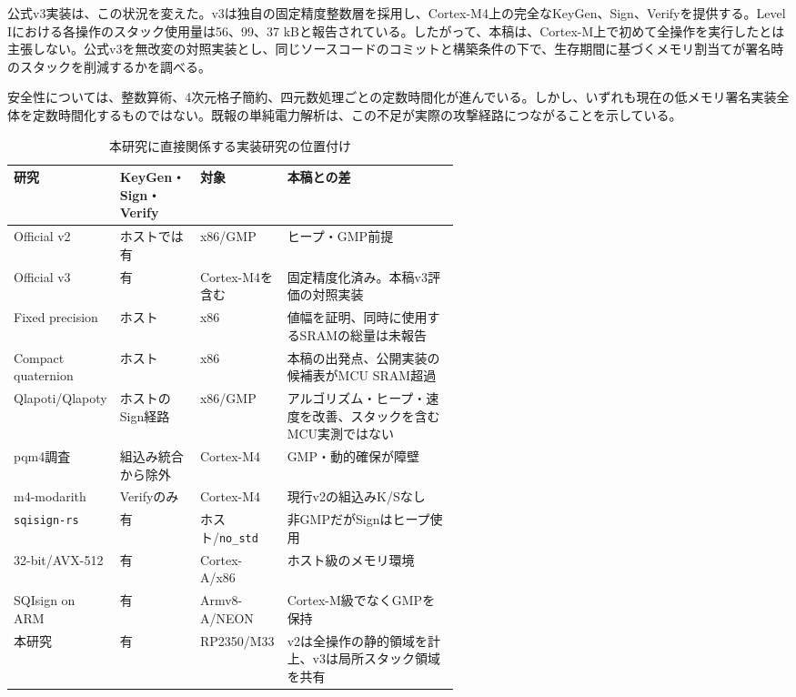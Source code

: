 \documentclass[a4paper,10pt]{ltjsarticle}
\theoremstyle{definition}
\theoremstyle{remark}
\begin{document}
公式v3実装は、この状況を変えた。v3は独自の固定精度整数層を採用し、Cortex-M4上の完全なKeyGen、Sign、Verifyを提供する。Level Iにおける各操作のスタック使用量は56、99、37 kBと報告されている\cite{sqisign-spec-v3,sqisign-code-v3}。したがって、本稿は、Cortex-M上で初めて全操作を実行したとは主張しない。公式v3を無改変の対照実装とし、同じソースコードのコミットと構築条件の下で、生存期間に基づくメモリ割当てが署名時のスタックを削減するかを調べる。

安全性については、整数算術\cite{ct-integer-2025}、4次元格子簡約\cite{ct-lattice-2025}、四元数処理\cite{ct-quaternion-2025}ごとの定数時間化が進んでいる。しかし、いずれも現在の低メモリ署名実装全体を定数時間化するものではない。既報の単純電力解析\cite{spa-2025}は、この不足が実際の攻撃経路につながることを示している。

\begin{table}[H]
  \centering
  \caption{本研究に直接関係する実装研究の位置付け}
  \label{tab:related-matrix}
  \scriptsize
  \begin{tabularx}{\linewidth}{@{}p{0.21\linewidth}p{0.18\linewidth}p{0.18\linewidth}X@{}}
    \toprule
    研究 & KeyGen・Sign・Verify & 対象 & 本稿との差 \\
    \midrule
    Official v2\cite{sqisign-spec-v201} & ホストでは有 & x86/GMP & ヒープ・GMP前提 \\
    Official v3\cite{sqisign-spec-v3} & 有 & Cortex-M4を含む & 固定精度化済み。本稿v3評価の対照実装 \\
    Fixed precision\cite{fixed-precision-2025} & ホスト & x86 & 値幅を証明、同時に使用するSRAMの総量は未報告 \\
    Compact quaternion\cite{compact-quaternion-2026} & ホスト & x86 & 本稿の出発点、公開実装の候補表がMCU SRAM超過 \\
    Qlapoti/\allowbreak Qlapoty\cite{qlapoti-2025,qlapoty-2026} & ホストのSign経路 & x86/GMP & アルゴリズム・ヒープ・速度を改善、スタックを含むMCU実測ではない \\
    pqm4調査\cite{pqm4-2024} & 組込み統合から除外 & Cortex-M4 & GMP・動的確保が障壁 \\
    m4-\allowbreak modarith\cite{m4-modarith-2025} & Verifyのみ & Cortex-M4 & 現行v2の組込みK/Sなし \\
    \texttt{sqisign-rs}\cite{sqisign-rs-2026} & 有 & ホスト/\texttt{no\_std} & 非GMPだがSignはヒープ使用 \\
    32-bit/AVX-512\cite{sqisign-32bit-2024,sqisign-avx512-2026} & 有 & Cortex-A/x86 & ホスト級のメモリ環境 \\
    SQIsign on ARM\cite{sqisign-arm-2026} & 有 & Armv8-A/NEON & Cortex-M級でなくGMPを保持 \\
    本研究 & 有 & RP2350/M33 & v2は全操作の静的領域を計上、v3は局所スタック領域を共有 \\
    \bottomrule
  \end{tabularx}
\end{table}
\end{document}
